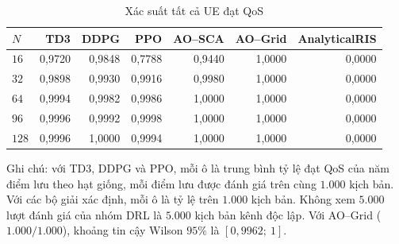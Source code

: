 \begin{table}[htbp]
\centering
\caption{Xác suất tất cả UE đạt QoS}
\label{tab:ch4-qos}
\footnotesize
\begin{tabular}{@{}lrrrrrr@{}}
\toprule
$N$ & \textbf{TD3} & \textbf{DDPG} & \textbf{PPO} & \textbf{AO--SCA} & \textbf{AO--Grid} & \textbf{AnalyticalRIS} \\
\midrule
$16$ & 0,9720 & 0,9848 & 0,7788 & 0,9440 & 1,0000 & 0,0000 \\
$32$ & 0,9898 & 0,9930 & 0,9916 & 0,9980 & 1,0000 & 0,0000 \\
$64$ & 0,9994 & 0,9982 & 0,9986 & 1,0000 & 1,0000 & 0,0000 \\
$96$ & 0,9996 & 0,9992 & 0,9998 & 1,0000 & 1,0000 & 0,0000 \\
$128$ & 0,9996 & 1,0000 & 0,9994 & 1,0000 & 1,0000 & 0,0000 \\
\bottomrule
\end{tabular}
\par\smallskip
\parbox{\linewidth}{\scriptsize Ghi chú: với TD3, DDPG và PPO, mỗi ô là trung bình tỷ lệ đạt
QoS của năm điểm lưu theo hạt giống, mỗi điểm lưu được đánh giá trên cùng $1.000$ kịch bản.
Với các bộ giải xác định, mỗi ô là tỷ lệ trên $1.000$ kịch bản. Không xem $5.000$ lượt đánh
giá của nhóm DRL là $5.000$ kịch bản kênh độc lập. Với AO--Grid ($1.000/1.000$), khoảng tin
cậy Wilson $95\%$ là $[0,9962;\ 1]$.}
\end{table}
